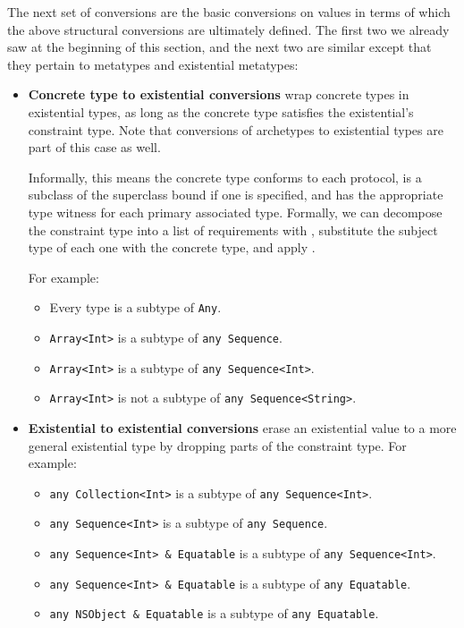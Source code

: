 \documentclass[../generics]{subfiles}
\begin{document}
The next set of conversions are the basic conversions on values in terms of which the above structural conversions are ultimately defined. The first two we already saw at the beginning of this section, and the next two are similar except that they pertain to metatypes and existential metatypes:
\begin{itemize}
\item {}\textbf{Concrete type to existential conversions} wrap concrete types in existential types, as long as the concrete type satisfies the existential's constraint type. Note that conversions of archetypes to existential types are part of this case as well.

Informally, this means the concrete type conforms to each protocol, is a subclass of the superclass bound if one is specified, and has the appropriate type witness for each primary associated type. Formally, we can decompose the constraint type into a list of requirements with , substitute the subject type of each one with the concrete type, and apply .

For example:
\begin{itemize}
\item Every type is a subtype of \texttt{Any}.
\item \verb|Array<Int>| is a subtype of \verb|any Sequence|.
\item \verb|Array<Int>| is a subtype of \verb|any Sequence<Int>|.
\item \verb|Array<Int>| is not a subtype of \verb|any Sequence<String>|.
\end{itemize}

\item \textbf{Existential to existential conversions} erase an existential value to a more general existential type by dropping parts of the constraint type. For example:
\begin{itemize}
\item \verb|any Collection<Int>| is a subtype of \verb|any Sequence<Int>|.
\item \verb|any Sequence<Int>| is a subtype of \verb|any Sequence|.
\item \verb|any Sequence<Int> & Equatable| is a subtype of \verb|any Sequence<Int>|.
\item \verb|any Sequence<Int> & Equatable| is a subtype of \verb|any Equatable|.
\item \verb|any NSObject & Equatable| is a subtype of \verb|any Equatable|.
\end{itemize}


\end{itemize}
\end{document}
